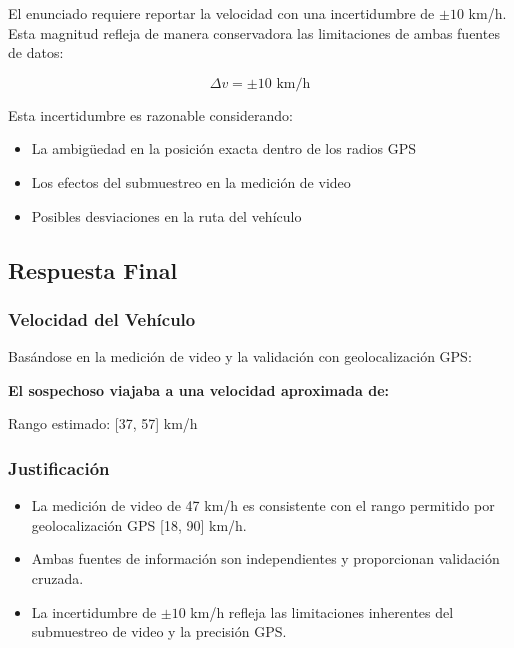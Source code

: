 \documentclass[12pt]{article}
\begin{document}
El enunciado requiere reportar la velocidad con una incertidumbre de $\pm 10$ km/h. Esta magnitud refleja de manera conservadora las limitaciones de ambas fuentes de datos:

\begin{equation}
\Delta v = \pm 10 \text{ km/h}
\end{equation}

Esta incertidumbre es razonable considerando:
\begin{itemize}
    \item La ambigüedad en la posición exacta dentro de los radios GPS
    \item Los efectos del submuestreo en la medición de video
    \item Posibles desviaciones en la ruta del vehículo
\end{itemize}

\subsection*{Respuesta Final}

\subsubsection*{Velocidad del Vehículo}

Basándose en la medición de video y la validación con geolocalización GPS:

\begin{flushleft}
\textbf{\Large El sospechoso viajaba a una velocidad aproximada de:}

\vspace{0.5cm}

\begin{center}
\end{center}

\vspace{0.5cm}

Rango estimado: [37, 57] km/h

\end{flushleft}

\subsubsection*{Justificación}

\begin{itemize}
    \item La medición de video de 47 km/h es consistente con el rango permitido por geolocalización GPS [18, 90] km/h.
    \item Ambas fuentes de información son independientes y proporcionan validación cruzada.
    \item La incertidumbre de $\pm 10$ km/h refleja las limitaciones inherentes del submuestreo de video y la precisión GPS.
\end{itemize}
\end{document}
